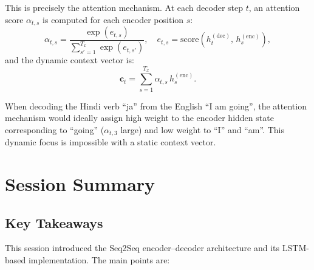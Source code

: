 \documentclass[12pt,a4paper]{article}
\begin{document}
This is precisely the attention mechanism. At each decoder step $t$, an attention score
$\alpha_{t,s}$ is computed for each encoder position $s$:
\begin{equation}
  \alpha_{t,s} = \frac{\exp(e_{t,s})}{\sum_{s'=1}^{T_x}\exp(e_{t,s'})},
  \quad e_{t,s} = \text{score}\!\left(h_t^{(\text{dec})},\, h_s^{(\text{enc})}\right),
  \label{eq:attention}
\end{equation}
and the dynamic context vector is:
\begin{equation}
  \mathbf{c}_t = \sum_{s=1}^{T_x} \alpha_{t,s}\,h_s^{(\text{enc})}.
  \label{eq:dynamic_context}
\end{equation}

\begin{example}[title={Attention in translation}]
  When decoding the Hindi verb ``ja'' from the English ``I am going'', the attention mechanism
  would ideally assign high weight to the encoder hidden state corresponding to ``going''
  ($\alpha_{t,3}$ large) and low weight to ``I'' and ``am''. This dynamic focus is impossible
  with a static context vector.
\end{example}

\section{Session Summary}
\label{sec:summary}

\subsection{Key Takeaways}

This session introduced the Seq2Seq encoder--decoder architecture and its LSTM-based
implementation. The main points are:
\end{document}

